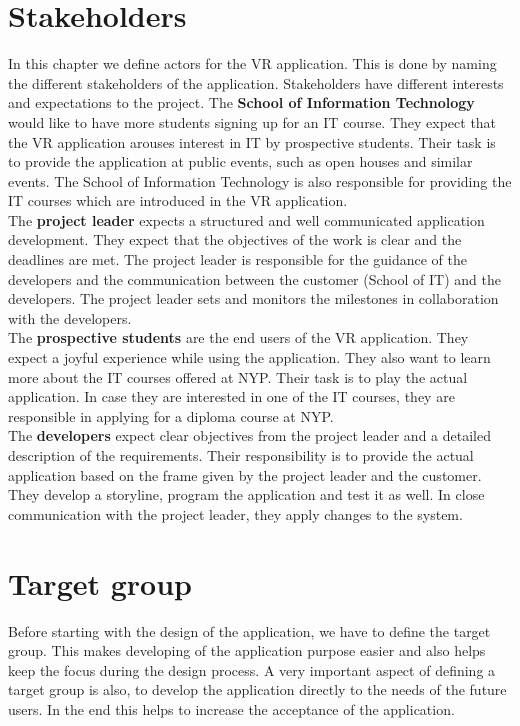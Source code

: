 \section{Stakeholders}
In this chapter we define actors for the VR application. This is done by naming the different stakeholders of the application.
Stakeholders have different interests and expectations to the project. The \textbf{School of Information Technology} would like to have more students signing up for an IT course. They expect that the VR application arouses interest in IT by prospective students. Their task is to provide the application at public events, such as open houses and similar events. The School of Information Technology is also responsible for providing the IT courses which are introduced in the VR application. \\
The \textbf{project leader} expects a structured and well communicated application development. They expect that the objectives of the work is clear and the deadlines are met. The project leader is responsible for the guidance of the developers and the communication between the customer (School of IT) and the developers. The project leader sets and monitors the milestones in collaboration with the developers.\\
The \textbf{prospective students} are the end users of the VR application. They expect a joyful experience while using the application. They also want to learn more about the IT courses offered at NYP. Their task is to play the actual application. In case they are interested in one of the IT courses, they are responsible in applying for a diploma course at NYP.\\
The \textbf{developers} expect clear objectives from the project leader and a detailed description of the requirements. Their responsibility is to provide the actual application based on the frame given by the project leader and the customer. They develop a storyline, program the application and test it as well. In close communication with the project leader, they apply changes to the system.
\section{Target group}
Before starting with the design of the application, we have to define the target group. This makes developing of the application purpose easier and also helps keep the focus during the design process. A very important aspect of defining a target group is also, to develop the application directly to the needs of the future users. In the end this helps to increase the acceptance of the application. 

